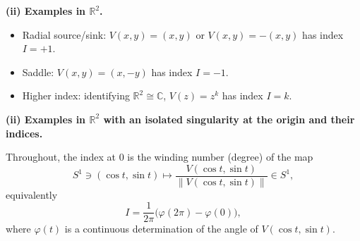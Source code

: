 \documentclass[12pt,a4paper]{article}
\theoremstyle{plain}
\theoremstyle{definition}      %
\begin{document}
	\medskip
	\noindent\textbf{(ii) Examples in $\mathbb{R}^2$.}
	\begin{itemize}
		\item Radial source/sink: $V(x,y)=(x,y)$ or $V(x,y)=-(x,y)$ has index $I=+1$.
		\item Saddle: $V(x,y)=(x,-y)$ has index $I=-1$.
		\item Higher index: identifying $\mathbb{R}^2\cong\mathbb{C}$, $V(z)=z^k$ has index $I=k$.
	\end{itemize}
	
	
	\medskip
	\noindent\textbf{(ii) Examples in $\mathbb{R}^2$ with an isolated singularity at the origin and their indices.}
	
	\medskip
	\noindent Throughout, the index at $0$ is the winding number (degree) of the map
	\[
	S^1 \ni (\cos t,\sin t)\longmapsto \frac{V(\cos t,\sin t)}{\|V(\cos t,\sin t)\|}\in S^1,
	\]
	equivalently
	\[
	I=\frac{1}{2\pi}\bigl(\varphi(2\pi)-\varphi(0)\bigr),
	\]
	where $\varphi(t)$ is a continuous determination of the angle of $V(\cos t,\sin t)$.
	
\end{document}
